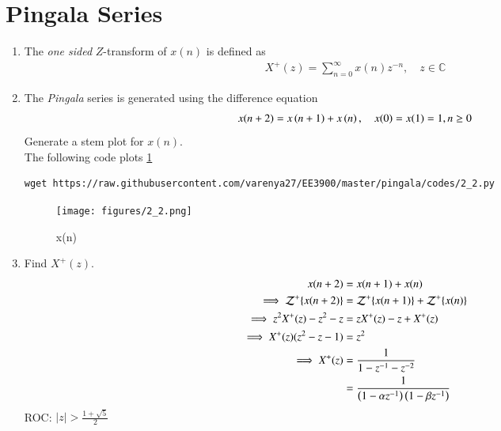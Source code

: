 \documentclass[journal,12pt,twocolumn]{IEEEtran}
\renewcommand\thesection{\arabic{section}}
\begin{document}
\section{Pingala Series}
\begin{enumerate}[label=\thesection.\arabic*,ref=\thesection.\theenumi]
\item The {\em one sided} $Z$-transform of $x(n)$ is defined as 
\begin{align}
	X^{+}(z) = \sum_{n = 0}^{\infty}x(n)z^{-n}, \quad z \in \mathbb{C}
\label{eq:one-Z}
\end{align}
	\item The {\em Pingala} series is generated using the difference equation 
\begin{align}
	x(n+2) = x\left(n+1\right) + x\left(n\right),  \quad x(0) = x(1) = 1, n \ge 0
	\label{eq:10-pingala}
\end{align}
Generate a stem plot for $x(n)$.\\
\solution The following code plots \ref{fig:xn}
	    \begin{lstlisting}
wget https://raw.githubusercontent.com/varenya27/EE3900/master/pingala/codes/2_2.py
\end{lstlisting}
\begin{figure}
    \centering
    \texttt{[image: figures/2\_2.png]}
    \caption{x(n)}
    \label{fig:xn}
\end{figure}
\item 		Find $X^{+}(z)$.\\
\solution
\begin{align}
    x(n+2)&=x(n+1)+x(n)\\
    \implies \mathcal{Z}^{+}\{x(n+2)\}&=\mathcal{Z}^{+}\{x(n+1)\}+\mathcal{Z}^{+}\{x(n)\}\\
    \implies z^2X^{+}(z)-z^2-z&=zX^{+}(z)-z+X^{+}(z)\\
    \implies X^{+}(z)(z^2-z-1)&=z^2\\
    \implies X^{+}(z) &= \frac{1}{1-z^{-1}-z^{-2}}\\
    &= \frac{1}{\left(1-\alpha z^{-1}\right) \left(1-\beta z^{-1}\right)}
\end{align}
ROC: $|z|>\frac{1+\sqrt{5}}{2}$


\end{enumerate}
\end{document}
